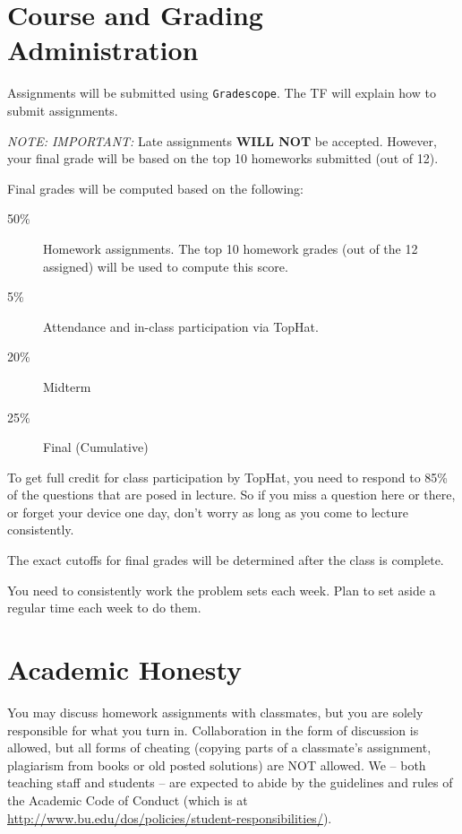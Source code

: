 \documentclass[11pt]{article}
\begin{document}
\newpage
\section*{Course and Grading Administration}

Assignments will be submitted using \texttt{Gradescope}.   The TF will
explain how to submit assignments.  

\emph{NOTE: IMPORTANT:} Late assignments \textbf{WILL NOT} be accepted.
However, your final 
grade will be based on the top 10 homeworks submitted (out of 12).   

Final grades will be computed based on the following:
\begin{description}
\item[50\%] Homework assignments.  The top 10 homework grades (out of the
  12 assigned) will be used to compute this score.
\item[5\%] Attendance and in-class participation via TopHat.
\item[20\%] Midterm
\item[25\%] Final (Cumulative)
\end{description}

To get full credit for class participation by TopHat, you need to 
respond to 85\% of the questions that are posed in lecture.   So if
you miss a question here or there, or forget your device one day, don't
worry as long as you come to lecture consistently.

The exact cutoffs for final grades will be determined after the class is
complete.

You need to consistently work the problem sets each week.   Plan
  to set aside a regular time each week to do them.

\newpage

\section*{Academic Honesty}

You may discuss homework assignments with classmates, but you are 
solely responsible for what you turn in. Collaboration in the form of
discussion is allowed, but all forms of cheating (copying parts of a
classmate's assignment, plagiarism from books or old posted solutions)
are NOT allowed. We -- both teaching staff and students -- are expected
to abide by the guidelines and rules of the Academic Code of Conduct
(which is at
\url{http://www.bu.edu/dos/policies/student-responsibilities/}).
\end{document}
